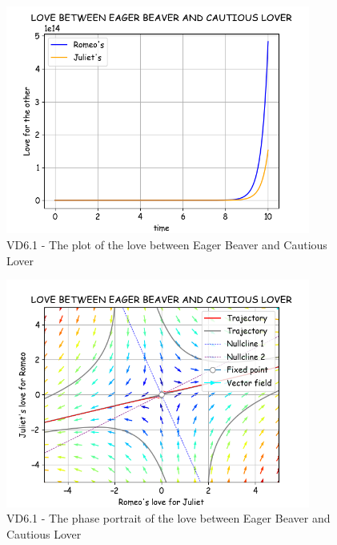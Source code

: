 \pagebreak
\begin{figure}[!htbp]
    \centering
    \includegraphics[width=100mm]{image/bt2/plot6.1.png}
    \caption{VD6.1 - The plot of the love between Eager Beaver and Cautious Lover}
\end{figure}
\begin{figure}[!htbp]
    \centering
    \includegraphics[width=100mm]{image/bt2/pp6.1.png}
    \caption{VD6.1 - The phase portrait of the love between Eager Beaver and Cautious Lover}
\end{figure}

